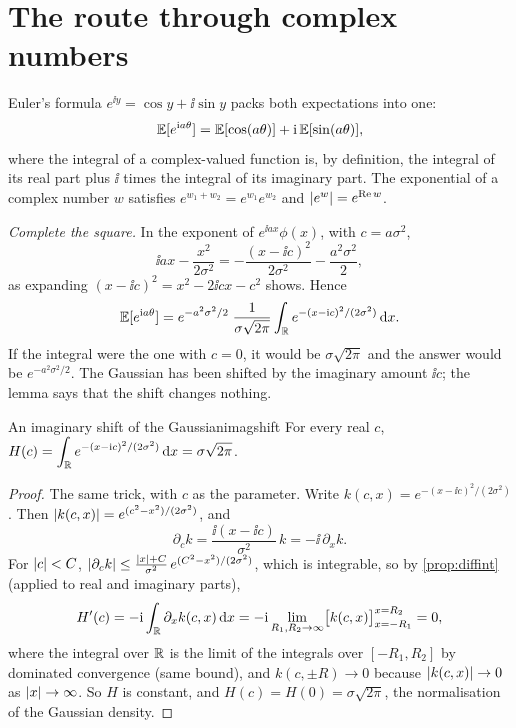\section{The route through complex numbers}
\label{sec:feyn-complex}

Euler's formula $e^{\ii y}=\cos y+\ii\sin y$ packs both expectations into
one:
\[
  \mathbb{E}[e^{\mathrm{i} a\theta}]=\mathbb{E}[\cos(a\theta)]+\mathrm{i}\,\mathbb{E}[\sin(a\theta)],
\]
where the integral of a complex-valued function is, by definition, the
integral of its real part plus $\ii$ times the integral of its imaginary
part. The exponential of a complex number $w$ satisfies
$e^{w_1+w_2}=e^{w_1}e^{w_2}$ and $\left\lvert e^w\right\rvert=e^{\operatorname{Re}w}$.

\emph{Complete the square.} In the exponent of
$e^{\ii ax}\phi(x)$, with $c=a\sigma^2$,
\[
  \ii ax-\frac{x^2}{2\sigma^2}
  =-\frac{(x-\ii c)^2}{2\sigma^2}-\frac{a^2\sigma^2}2 ,
\]
as expanding $(x-\ii c)^2=x^2-2\ii cx-c^2$ shows. Hence
\[
  \mathbb{E}[e^{\mathrm{i} a\theta}]
  =e^{-a^2\sigma^2/2}\;\frac{1}{\sigma\sqrt{2\pi}}
   \int_{\mathbb{R}} e^{-(x-\mathrm{i} c)^2/(2\sigma^2)}\,\mathrm dx .
\]
If the integral were the one with $c=0$, it would be $\sigma\sqrt{2\pi}$
and the answer would be $e^{-a^2\sigma^2/2}$. The Gaussian has been
shifted by the imaginary amount $\ii c$; the lemma says that the shift
changes nothing.

\begin{lemma}{An imaginary shift of the Gaussian}{imagshift}
For every real $c$,
$\displaystyle H(c)=\int_{\mathbb{R}} e^{-(x-\mathrm{i} c)^2/(2\sigma^2)}\,\mathrm dx
=\sigma\sqrt{2\pi}$.
\end{lemma}

\begin{proof}
The same trick, with $c$ as the parameter. Write
$k(c,x)=e^{-(x-\ii c)^2/(2\sigma^2)}$. Then
$\left\lvert k(c,x)\right\rvert=e^{(c^2-x^2)/(2\sigma^2)}$, and
\[
  \partial_ck=\frac{\ii(x-\ii c)}{\sigma^2}\,k
  =-\ii\,\partial_xk .
\]
For $\left\lvert c\right\rvert<C$, $\left\lvert \partial_ck\right\rvert\le\frac{\left\lvert x\right\rvert+C}{\sigma^2}\,
e^{(C^2-x^2)/(2\sigma^2)}$, which is integrable, so by
\cref{prop:diffint} (applied to real and imaginary parts),
\[
  H'(c)=-\mathrm{i}\int_{\mathbb{R}}\partial_xk(c,x)\,\mathrm dx
  =-\mathrm{i}\lim_{R_1,R_2\to\infty}\bigl[k(c,x)\bigr]_{x=-R_1}^{x=R_2}=0,
\]
where the integral over $\mathbb{R}$ is the limit of the integrals over
$[-R_1,R_2]$ by dominated convergence (same bound), and $k(c,\pm R)\to0$
because $\left\lvert k(c,x)\right\rvert\to0$ as $\left\lvert x\right\rvert\to\infty$. So $H$ is constant, and
$H(c)=H(0)=\sigma\sqrt{2\pi}$, the normalisation of the Gaussian density.
\end{proof}


